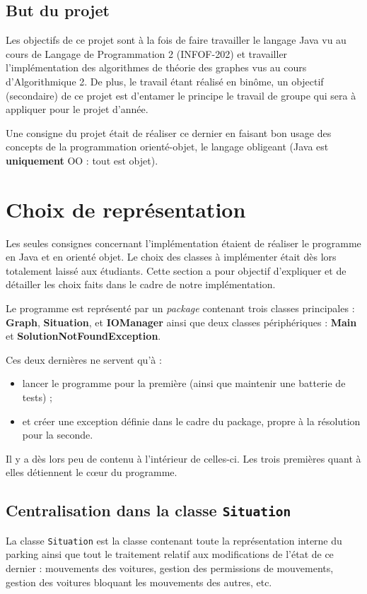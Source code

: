 \documentclass{article}
\begin{document}
    \subsection{But du projet}
        Les objectifs de ce projet sont à la fois de faire travailler le langage Java vu au cours de Langage de Programmation 2 (INFOF-202) et
        travailler l'implémentation des algorithmes de théorie des graphes vus au cours d'Algorithmique 2. De plus, le travail étant réalisé en binôme,
        un objectif (secondaire) de ce projet est d'entamer le principe le travail de groupe qui sera à appliquer pour le projet d'année.

        Une consigne du projet était de réaliser ce dernier en faisant bon usage des concepts de la programmation orienté-objet, le langage
        obligeant (Java est \textbf{uniquement} OO : tout est objet).

\section{Choix de représentation}
    Les seules consignes concernant l'implémentation étaient de réaliser le programme en Java et en orienté objet. Le choix des classes à implémenter était
    dès lors totalement laissé aux étudiants. Cette section a pour objectif d'expliquer et de détailler les choix faits dans le cadre de notre implémentation.

    Le programme est représenté par un \textit{package} contenant trois classes principales : \textbf{Graph}, \textbf{Situation}, et \textbf{IOManager}
    ainsi que deux classes périphériques : \textbf{Main} et \textbf{SolutionNotFoundException}.

    Ces deux dernières ne servent qu'à :
    
    \begin{itemize}
        \item lancer le programme pour la première (ainsi que maintenir une batterie de tests) ;
        \item et créer une exception définie dans le cadre du package, propre à la résolution pour la seconde.
    \end{itemize}
    
    Il y a dès lors peu de contenu à l'intérieur de celles-ci. Les trois premières quant à elles détiennent le cœur du programme.

    \subsection{Centralisation dans la classe \texttt{Situation}}
        La classe \texttt{Situation} est la classe contenant toute la représentation interne du parking ainsi que tout le traitement relatif aux
        modifications de l'état de ce dernier : mouvements des voitures, gestion des permissions de mouvements, gestion des voitures bloquant
        les mouvements des autres, etc.
\end{document}
